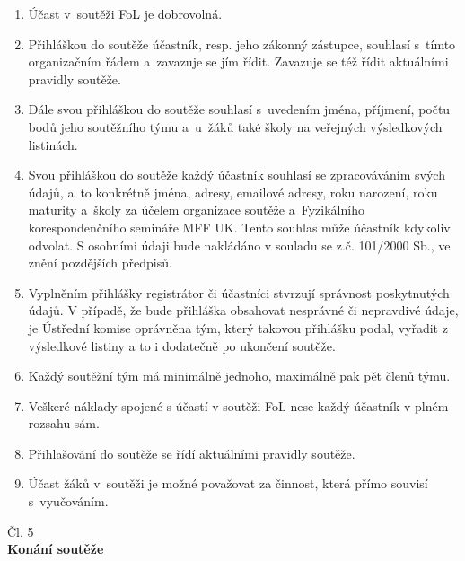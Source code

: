 \documentclass[a4paper,11pt,oneside]{article}
\begin{document}
\begin{enumerate}[(1)]
\item Účast v~soutěži FoL je dobrovolná.

\item Přihláškou do soutěže účastník, resp. jeho zákonný zástupce, souhlasí s~tímto organizačním řádem a~zavazuje se jím řídit. Zavazuje se též řídit aktuálními pravidly soutěže.

\item Dále svou přihláškou do soutěže souhlasí s~uvedením jména, příjmení, počtu bodů jeho soutěžního týmu a~u~žáků také školy na veřejných výsledkových listinách.

\item Svou přihláškou do soutěže každý účastník souhlasí se zpracováváním svých údajů, a~to konkrétně jména, adresy, emailové adresy, roku narození, roku maturity a~školy za účelem organizace soutěže a~Fyzikálního korespondenčního semináře MFF UK. Tento souhlas může účastník kdykoliv odvolat.  S osobními údaji bude nakládáno v souladu se z.č. 101/2000 Sb., ve znění pozdějších předpisů.

\item Vyplněním přihlášky registrátor či účastníci stvrzují správnost poskytnutých údajů. V případě, že bude přihláška obsahovat nesprávné či nepravdivé údaje, je Ústřední komise oprávněna  tým, který takovou přihlášku podal, vyřadit z výsledkové listiny a to i dodatečně po ukončení soutěže.

\item Každý soutěžní tým má minimálně jednoho, maximálně pak pět členů týmu.

\item Veškeré náklady spojené s účastí v soutěži FoL nese každý účastník v plném rozsahu sám.

\item Přihlašování do soutěže se řídí aktuálními pravidly soutěže.

\item Účast žáků v~soutěži je možné považovat za činnost, která přímo souvisí s~vyučováním.

\end{enumerate}

\begin{center}
{\Large{Čl. 5}}\\
\large{\bf{Konání soutěže}}
\end{center}
\end{document}

